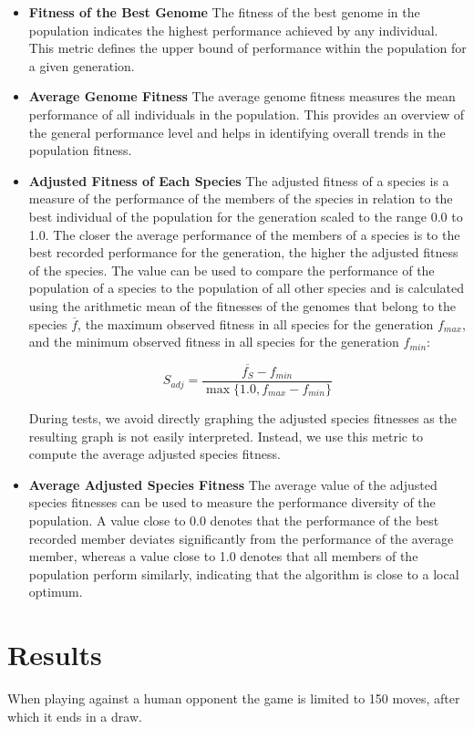 \documentclass[letterpaper, 12pt]{article}
\begin{document}
\begin{itemize}[leftmargin=*]
\item \textbf{Fitness of the Best Genome}
The fitness of the best genome in the population indicates the highest performance
achieved by any individual. This metric defines the upper bound of performance within
the population for a given generation.

\item \textbf{Average Genome Fitness}
The average genome fitness measures the mean performance of all individuals in the
population. This provides an overview of the general performance level and helps in
identifying overall trends in the population fitness.

\item \textbf{Adjusted Fitness of Each Species}
The adjusted fitness of a species is a measure of the performance of the members of the
species in relation to the best individual of the population for the generation scaled
to the range 0.0 to 1.0. The closer the average performance of the members of a species
is to the best recorded performance for the generation, the higher the adjusted fitness
of the species. The value can be used to compare the performance of the population of a
species to the population of all other species and is calculated using the arithmetic
mean of the fitnesses of the genomes that belong to the species \(\overline{f}\), the
maximum observed fitness in all species for the generation \(f_{max}\), and the minimum
observed fitness in all species for the generation \(f_{min}\):

\[S_{adj} = \frac{\overline{f_S}- f_{min}}{\max\{1.0, f_{max} - f_{min}\}}\]

During tests, we avoid directly graphing the adjusted species fitnesses as the resulting
graph is not easily interpreted. Instead, we use this metric to compute the average
adjusted species fitness.

\item \textbf{Average Adjusted Species Fitness}
The average value of the adjusted species fitnesses can be used to measure the
performance diversity of the population. A value close to 0.0 denotes that the
performance of the best recorded member deviates significantly from the performance of
the average member, whereas a value close to 1.0 denotes that all members of the
population perform similarly, indicating that the algorithm is close to a local optimum.
\end{itemize}

\section{Results}
When playing against a human opponent the game is limited to 150 moves, after which it
ends in a draw.
\end{document}
